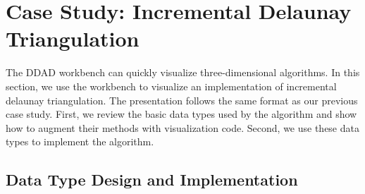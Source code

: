 \FloatBarrier
\section{Case Study: Incremental Delaunay Triangulation}


The DDAD workbench can quickly visualize three-dimensional algorithms. In this
section, we use the workbench to visualize an implementation of incremental
delaunay triangulation. The presentation follows the same format as our previous
case study. First, we review the basic data types used by the algorithm and
show how to augment their methods with visualization code. Second, we use these
data types to implement the algorithm.

\subsection{Data Type Design and Implementation}





% 

